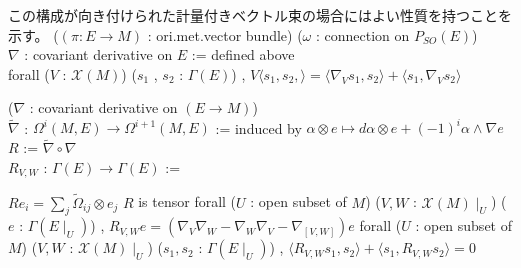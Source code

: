 \begin{Theorem}
\itemprop
\end{Theorem}

\begin{Theorem}
\itemnote
  この構成が向き付けられた計量付きベクトル束の場合にはよい性質を持つことを示す。
\itemprop
  \For (\((\pi : E \to M)\) : ori.met.vector bundle) (\(\omega\) : connection on \(P_{SO}(E)\)) \\
  \Let \(\nabla\) : covariant derivative on \(E\) := defined above \\
  \Then forall (\(V\) : \(\mathcal{X}(M)\)) (\(s_1\) , \(s_2\) : \(\Gamma(E)\)) , \(V \langle s_1 , s_2 , \rangle = \langle \nabla_V s_1 , s_2 \rangle + \langle s_1 , \nabla_V s_2 \rangle\)
\end{Theorem}

\begin{Definition}
\itemdefi
  \For (\(\nabla\) : covariant derivative on \((E \to M)\)) \\
  \Define \(\tilde{\nabla}\) : \(\Omega^i(M , E) \to \Omega^{i + 1}(M , E)\) := induced by \(\alpha \otimes e \mapsto d \alpha \otimes e + (-1)^i \alpha \wedge \nabla e\) \\
  \Define \(R\) := \(\tilde{\nabla} \circ \nabla\) \\
  \Define \(R_{V , W}\) : \(\Gamma(E) \to \Gamma(E)\) := \(\)
\end{Definition}

\begin{Theorem}
\itemprop
  \(R e_i = \sum_j \tilde{\Omega}_{ij} \otimes e_j\)
\itemprop
  \(R\) is tensor
\itemprop
  forall (\(U\) : open subset of \(M\)) (\(V , W\) : \(\mathcal{X}(M) \mid_{U}\)) (\(e\) : \(\Gamma(E \mid_{U})\)) , \(R_{V , W}e = (\nabla_V \nabla_W - \nabla_W \nabla_V - \nabla_{[V , W]}) e\)
\itemprop
  forall (\(U\) : open subset of \(M\)) (\(V , W\) : \(\mathcal{X}(M) \mid_{U}\)) (\(s_1 , s_2\) : \(\Gamma(E \mid_{U})\)) , \(\langle R_{V, W} s_1 , s_2 \rangle + \langle s_1 , R_{V, W} s_2 \rangle = 0\)
\end{Theorem}